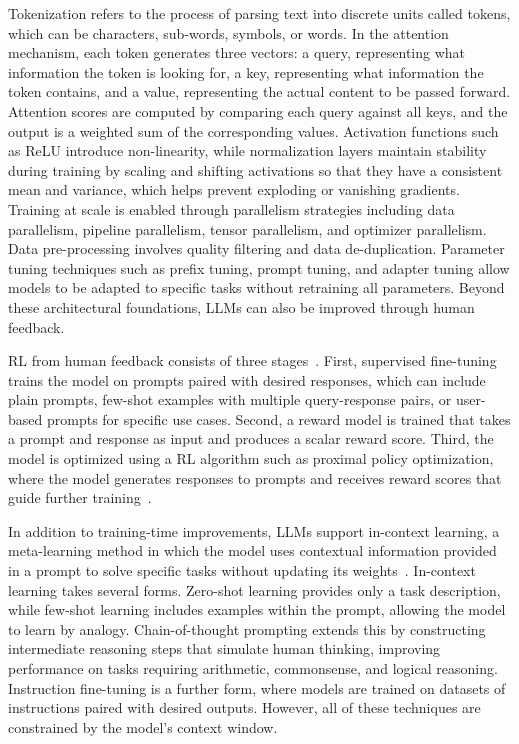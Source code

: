 \documentclass[
english,                 %
bibtex,                  %
includeExtraAbstracts, %
]{kththesis}
\numberwithin{listing}{chapter}
\begin{document}
Tokenization refers to the process of parsing text into discrete units called tokens, which can be characters, sub-words, symbols, or words. In the attention mechanism, each token generates three vectors: a query, representing what information the token is looking for, a key, representing what information the token contains, and a value, representing the actual content to be passed forward. Attention scores are computed by comparing each query against all keys, and the output is a weighted sum of the corresponding values. Activation functions such as \gls{ReLU} introduce non-linearity, while normalization layers maintain stability during training by scaling and shifting activations so that they have a consistent mean and variance, which helps prevent exploding or vanishing gradients. Training at scale is enabled through parallelism strategies including data parallelism, pipeline parallelism, tensor parallelism, and optimizer parallelism. Data pre-processing involves quality filtering and data de-duplication. Parameter tuning techniques such as prefix tuning, prompt tuning, and adapter tuning allow models to be adapted to specific tasks without retraining all parameters. Beyond these architectural foundations, \glspl{LLM} can also be improved through human feedback.

\Gls{RL} from human feedback consists of three stages~\cite{wu_brief_2023}. First, supervised fine-tuning trains the model on prompts paired with desired responses, which can include plain prompts, few-shot examples with multiple query-response pairs, or user-based prompts for specific use cases. Second, a reward model is trained that takes a prompt and response as input and produces a scalar reward score. Third, the model is optimized using a \gls{RL} algorithm such as proximal policy optimization, where the model generates responses to prompts and receives reward scores that guide further training~\cite{schulman_proximal_2017}.

In addition to training-time improvements, \glspl{LLM} support in-context learning, a meta-learning method in which the model uses contextual information provided in a prompt to solve specific tasks without updating its weights~\cite{yin_survey_2024}. In-context learning takes several forms. Zero-shot learning provides only a task description, while few-shot learning includes examples within the prompt, allowing the model to learn by analogy. Chain-of-thought prompting extends this by constructing intermediate reasoning steps that simulate human thinking, improving performance on tasks requiring arithmetic, commonsense, and logical reasoning. Instruction fine-tuning is a further form, where models are trained on datasets of instructions paired with desired outputs. However, all of these techniques are constrained by the model's context window.
\end{document}
